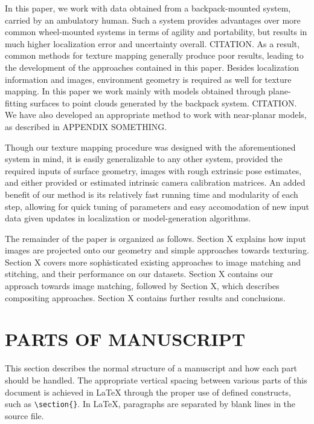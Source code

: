 \documentclass[]{spie}  %
\begin{document}
In this paper, we work with data obtained from a backpack-mounted
system, carried by an ambulatory human. Such a system provides
advantages over more common wheel-mounted systems in terms of agility
and portability, but results in much higher localization error and
uncertainty overall. CITATION. As a result, common methods for texture
mapping generally produce poor results, leading to the development of
the approaches contained in this paper. Besides localization
information and images, environment geometry is required as well for
texture mapping. In this paper we work mainly with models obtained
through plane-fitting surfaces to point clouds generated by the
backpack system. CITATION. We have also developed an appropriate
method to work with near-planar models, as described in APPENDIX
SOMETHING.

Though our texture mapping procedure was designed with the
aforementioned system in mind, it is easily generalizable to any other
system, provided the required inputs of surface geometry, images with
rough extrinsic pose estimates, and either provided or estimated
intrinsic camera calibration matrices. An added benefit of our method
is its relatively fast running time and modularity of each step,
allowing for quick tuning of parameters and easy accomodation of new
input data given updates in localization or model-generation
algorithms.

The remainder of the paper is organized as follows. Section X explains
how input images are projected onto our geometry and simple approaches
towards texturing. Section X covers more sophisticated existing
approaches to image matching and stitching, and their performance on
our datasets. Section X contains our approach towards image matching,
followed by Section X, which describes compositing approaches. Section
X contains further results and conclusions.
\section{PARTS OF MANUSCRIPT}

This section describes the normal structure of a manuscript and how
each part should be handled.  The appropriate vertical spacing between
various parts of this document is achieved in LaTeX through the proper
use of defined constructs, such as \verb|\section{}|.  In LaTeX,
paragraphs are separated by blank lines in the source file.
\end{document}
